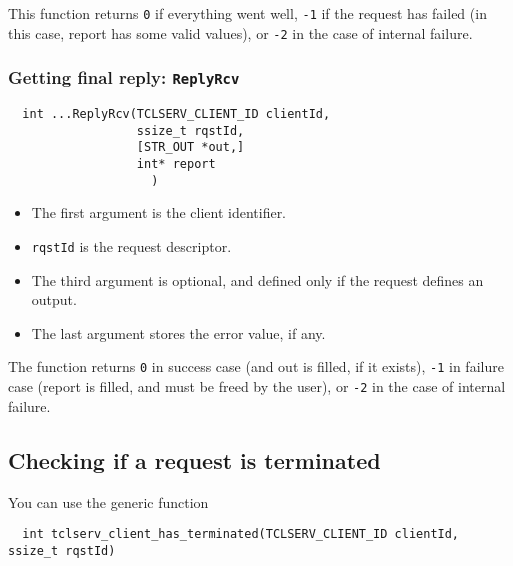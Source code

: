 This function returns \texttt{0} if  everything went well, \texttt{-1} if
the request has  failed (in this case, report has  some valid values), or
\texttt{-2} in the case of internal failure.

\subsubsection{Getting final reply: \texttt{ReplyRcv}}

\begin{center}\begin{cartouche}\small\begin{verbatim}
  int ...ReplyRcv(TCLSERV_CLIENT_ID clientId,
                  ssize_t rqstId, 
                  [STR_OUT *out,]
                  int* report
					)
\end{verbatim}\end{cartouche}\end{center}


\begin{itemize}
\item The first argument is the client identifier.

\item \texttt{rqstId} is the request descriptor.

\item The third argument is optional, and defined only if the request defines
an output.

\item The last argument stores the error value, if any.
\end{itemize}

The function returns \texttt{0} in success case (and out is filled, if it
exists), \texttt{-1} in failure case (report is filled, and must be freed by
the user), or \texttt{-2} in the case of internal failure.

\subsection{Checking if a request is terminated}

You can use the generic function 

\begin{center}\begin{cartouche}\small\begin{verbatim}
  int tclserv_client_has_terminated(TCLSERV_CLIENT_ID clientId, ssize_t rqstId)
\end{verbatim}\end{cartouche}\end{center}

